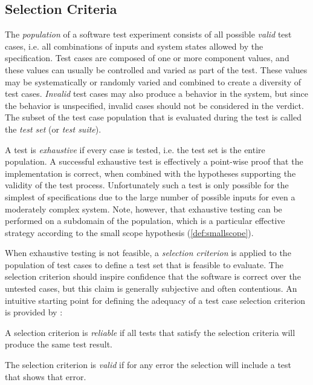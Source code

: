\subsection{Selection Criteria}
The \emph{population} of a software test experiment consists of 
all possible \emph{valid} test cases,
i.e. all combinations of inputs and system states allowed by the specification.
Test cases are composed of one or more component values,
and these values can usually be controlled and varied as part of the test.
These values may be systematically or randomly varied
and combined to create a diversity of test cases.
\emph{Invalid} test cases may also produce a behavior in the system,
but since the behavior is unspecified, 
invalid cases should not be considered in the verdict.
The subset of the test case population that is 
evaluated during the test is called the \emph{test set} 
(or \emph{test suite}).

A test is \emph{exhaustive} if every case is tested,
i.e. the test set is the entire population.
A successful exhaustive test is effectively a point-wise proof
that the implementation is correct,
when combined with the hypotheses supporting the validity of the test process.
Unfortunately such a test is only possible for the simplest of specifications
due to the large number of possible inputs for even a moderately complex system.
Note, however, that exhaustive testing can be performed on a subdomain of the population,
which is a particular effective strategy according to the small scope hypothesis (\ref{def:smallscope}).

When exhaustive testing is not feasible,
a \emph{selection criterion} is applied to the population of test cases
to define a test set that is feasible to evaluate.
The selection criterion should inspire confidence that 
the software is correct over the untested cases,
but this claim is generally subjective and often contentious.
An intuitive starting point for defining the adequacy of a test case selection criterion
is provided by \cite{GoodenoughGerhart1975}:
\begin{df}
A selection criterion is \emph{reliable} if 
all tests that satisfy the selection criteria will produce the same test result.
\end{df}

\begin{df}
The selection criterion is \emph{valid} if 
for any error the selection will include a test that shows that error.
\end{df}

